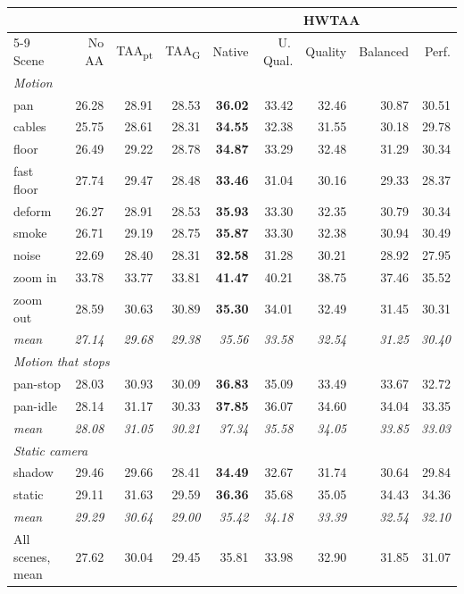 \begin{tabular}{lrrrrrrrr}
\toprule
 & \multicolumn{3}{c}{} & \multicolumn{5}{c}{HWTAA} \\
\cmidrule(lr){5-9}
Scene & No AA & TAA\textsubscript{pt} & TAA\textsubscript{G} & Native & U.\,Qual. & Quality & Balanced & Perf. \\
\midrule
\multicolumn{9}{l}{\textit{Motion}} \\
\quad pan & 26.28 & 28.91 & 28.53 & \textbf{36.02} & 33.42 & 32.46 & 30.87 & 30.51 \\
\quad cables & 25.75 & 28.61 & 28.31 & \textbf{34.55} & 32.38 & 31.55 & 30.18 & 29.78 \\
\quad floor & 26.49 & 29.22 & 28.78 & \textbf{34.87} & 33.29 & 32.48 & 31.29 & 30.34 \\
\quad fast floor & 27.74 & 29.47 & 28.48 & \textbf{33.46} & 31.04 & 30.16 & 29.33 & 28.37 \\
\quad deform & 26.27 & 28.91 & 28.53 & \textbf{35.93} & 33.30 & 32.35 & 30.79 & 30.34 \\
\quad smoke & 26.71 & 29.19 & 28.75 & \textbf{35.87} & 33.30 & 32.38 & 30.94 & 30.49 \\
\quad noise & 22.69 & 28.40 & 28.31 & \textbf{32.58} & 31.28 & 30.21 & 28.92 & 27.95 \\
\quad zoom in & 33.78 & 33.77 & 33.81 & \textbf{41.47} & 40.21 & 38.75 & 37.46 & 35.52 \\
\quad zoom out & 28.59 & 30.63 & 30.89 & \textbf{35.30} & 34.01 & 32.49 & 31.45 & 30.31 \\
\quad\textit{mean} & \textit{27.14} & \textit{29.68} & \textit{29.38} & \textit{35.56} & \textit{33.58} & \textit{32.54} & \textit{31.25} & \textit{30.40} \\
\multicolumn{9}{l}{\textit{Motion that stops}} \\
\quad pan-stop & 28.03 & 30.93 & 30.09 & \textbf{36.83} & 35.09 & 33.49 & 33.67 & 32.72 \\
\quad pan-idle & 28.14 & 31.17 & 30.33 & \textbf{37.85} & 36.07 & 34.60 & 34.04 & 33.35 \\
\quad\textit{mean} & \textit{28.08} & \textit{31.05} & \textit{30.21} & \textit{37.34} & \textit{35.58} & \textit{34.05} & \textit{33.85} & \textit{33.03} \\
\multicolumn{9}{l}{\textit{Static camera}} \\
\quad shadow & 29.46 & 29.66 & 28.41 & \textbf{34.49} & 32.67 & 31.74 & 30.64 & 29.84 \\
\quad static & 29.11 & 31.63 & 29.59 & \textbf{36.36} & 35.68 & 35.05 & 34.43 & 34.36 \\
\quad\textit{mean} & \textit{29.29} & \textit{30.64} & \textit{29.00} & \textit{35.42} & \textit{34.18} & \textit{33.39} & \textit{32.54} & \textit{32.10} \\
\midrule
All scenes, mean & 27.62 & 30.04 & 29.45 & 35.81 & 33.98 & 32.90 & 31.85 & 31.07 \\
\bottomrule
\end{tabular}
